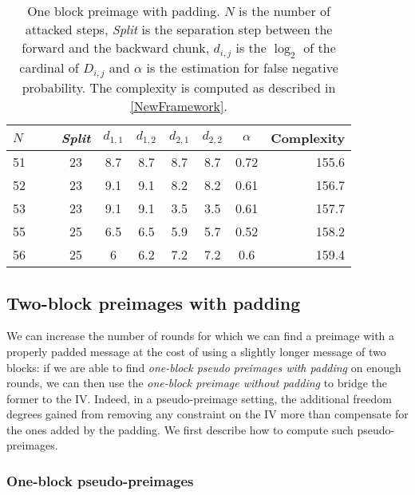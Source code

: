   \begin{table}[htb]
    \caption[One block preimage with padding.]{One block preimage with padding. $N$ is the 
              number of attacked steps, \emph{Split} is the separation step between the
              forward and the backward chunk, $d_{i,j}$ is the $\log_2$ of the cardinal
              of $D_{i,j}$ and $\alpha$ is the estimation for false negative probability. The complexity
              is computed as described in \autoref{NewFramework}.\label{SHA12}}
    \begin{center}
      \begin{tabular}{l c c c c c c r @{}} \toprule
        $N\qquad$ &  \emph{Split} & $d_{1,1}$ &  $d_{1,2}$ & $d_{2,1}$ & $d_{2,2}$ & $\alpha $ & Complexity \\\midrule
      51    & 23  & 8.7  & 8.7 & 8.7 & 8.7  & 0.72  & 155.6\\ 
      52    & 23  & 9.1  & 9.1 & 8.2 & 8.2  & 0.61  & 156.7\\ 
      53    & 23  & 9.1  & 9.1 & 3.5 & 3.5  & 0.61  & 157.7\\ 
      55    & 25  & 6.5  & 6.5 & 5.9 & 5.7  & 0.52  & 158.2\\ 
      56    & 25  & 6  & 6.2 & 7.2 & 7.2  & 0.6  & 159.4\\ 
        \bottomrule
        \hline
      \end{tabular}
    \end{center}
  \end{table}



  \subsection{Two-block preimages with padding}
\label{sec:one_two}


  We can increase the number of rounds for which we can find a preimage with a properly padded
  message at the cost of using a slightly longer message of two blocks: if we are able to find
  \emph{one-block pseudo preimages with padding} on enough rounds, we can then use the
  \emph{one-block preimage without padding} to bridge the former to the IV. Indeed,
  in a pseudo-preimage
  setting, the additional freedom degrees gained from removing any constraint on the IV
  more than compensate for the ones added by the padding. We first describe
  how to compute such pseudo-preimages.

  \subsubsection{One-block pseudo-preimages}

